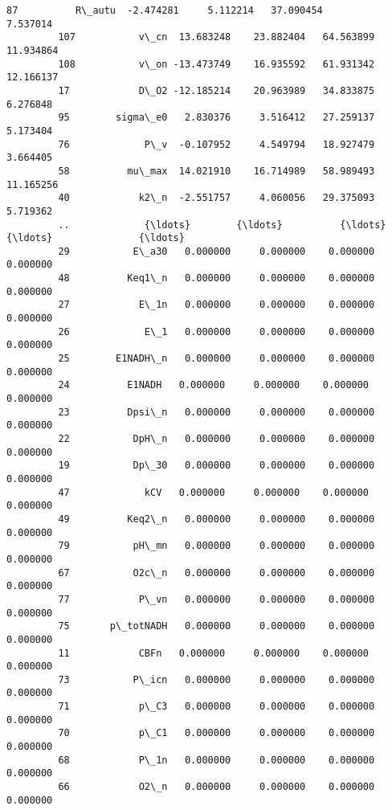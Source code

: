 \documentclass[11pt]{article}
\begin{document}
\begin{Verbatim}[commandchars=\\\{\}]
         87          R\_autu  -2.474281     5.112214   37.090454          7.537014   
         107           v\_cn  13.683248    23.882404   64.563899         11.934864   
         108           v\_on -13.473749    16.935592   61.931342         12.166137   
         17            D\_O2 -12.185214    20.963989   34.833875          6.276848   
         95        sigma\_e0   2.830376     3.516412   27.259137          5.173404   
         76             P\_v  -0.107952     4.549794   18.927479          3.664405   
         58          mu\_max  14.021910    16.714989   58.989493         11.165256   
         40            k2\_n  -2.551757     4.060056   29.375093          5.719362   
         ..             {\ldots}        {\ldots}          {\ldots}         {\ldots}               {\ldots}   
         29           E\_a30   0.000000     0.000000    0.000000          0.000000   
         48          Keq1\_n   0.000000     0.000000    0.000000          0.000000   
         27            E\_1n   0.000000     0.000000    0.000000          0.000000   
         26             E\_1   0.000000     0.000000    0.000000          0.000000   
         25        E1NADH\_n   0.000000     0.000000    0.000000          0.000000   
         24          E1NADH   0.000000     0.000000    0.000000          0.000000   
         23          Dpsi\_n   0.000000     0.000000    0.000000          0.000000   
         22           DpH\_n   0.000000     0.000000    0.000000          0.000000   
         19           Dp\_30   0.000000     0.000000    0.000000          0.000000   
         47             kCV   0.000000     0.000000    0.000000          0.000000   
         49          Keq2\_n   0.000000     0.000000    0.000000          0.000000   
         79           pH\_mn   0.000000     0.000000    0.000000          0.000000   
         67           O2c\_n   0.000000     0.000000    0.000000          0.000000   
         77            P\_vn   0.000000     0.000000    0.000000          0.000000   
         75       p\_totNADH   0.000000     0.000000    0.000000          0.000000   
         11            CBFn   0.000000     0.000000    0.000000          0.000000   
         73           P\_icn   0.000000     0.000000    0.000000          0.000000   
         71            p\_C3   0.000000     0.000000    0.000000          0.000000   
         70            p\_C1   0.000000     0.000000    0.000000          0.000000   
         68            P\_1n   0.000000     0.000000    0.000000          0.000000   
         66            O2\_n   0.000000     0.000000    0.000000          0.000000   

\end{Verbatim}
\end{document}
